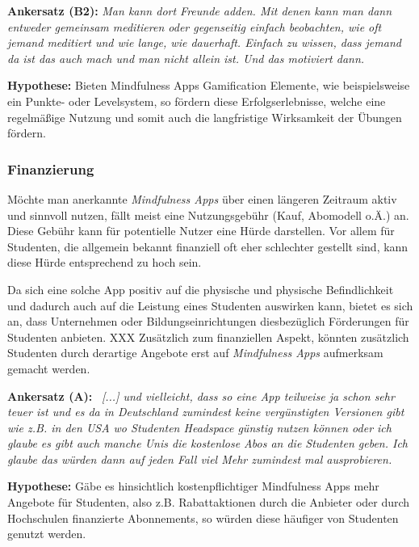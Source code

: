 \documentclass[10pt]{article}
\begin{document}
\medskip
\textbf{Ankersatz (B2):}
\newline
\grqq\textit{Man kann dort Freunde adden. Mit denen kann man dann entweder gemeinsam meditieren oder gegenseitig einfach beobachten, wie oft jemand meditiert und wie lange, wie dauerhaft. Einfach zu wissen, dass jemand da ist das auch mach und man nicht allein ist. Und das motiviert dann.}\grqq\
\medskip

\medskip
\textbf{Hypothese: }
\newline
Bieten Mindfulness Apps Gamification Elemente, wie beispielsweise ein Punkte- oder Levelsystem, so fördern diese Erfolgserlebnisse, welche eine regelmäßige Nutzung und somit auch die langfristige Wirksamkeit der Übungen fördern.

\subsubsection{Finanzierung}
Möchte man anerkannte \textit{Mindfulness Apps} über einen längeren Zeitraum aktiv und sinnvoll nutzen, fällt meist eine Nutzungsgebühr (Kauf, Abomodell o.Ä.) an. Diese Gebühr kann für potentielle Nutzer eine Hürde darstellen. Vor allem für Studenten, die allgemein bekannt finanziell oft eher schlechter gestellt sind,  kann diese Hürde entsprechend zu hoch sein.

Da sich eine solche App positiv auf die physische und physische  Befindlichkeit und dadurch auch auf die Leistung eines Studenten auswirken kann, bietet es sich an, dass Unternehmen oder  Bildungseinrichtungen diesbezüglich Förderungen für Studenten anbieten. XXX
Zusätzlich zum finanziellen Aspekt, könnten zusätzlich Studenten durch derartige Angebote erst auf \textit{Mindfulness Apps} aufmerksam gemacht werden.

\medskip
\textbf{Ankersatz (A):}
\newline
\grqq\ \textit{[...] und vielleicht, dass so eine App teilweise ja schon sehr teuer ist und es da in Deutschland zumindest keine vergünstigten Versionen gibt wie z.B. in den USA wo Studenten Headspace günstig nutzen können oder ich glaube es gibt auch manche Unis die kostenlose Abos an die Studenten geben. Ich glaube das würden dann auf jeden Fall viel Mehr zumindest mal ausprobieren. }\grqq\
\medskip

\medskip
\textbf{Hypothese: }
\newline
Gäbe es hinsichtlich kostenpflichtiger Mindfulness Apps mehr Angebote für Studenten, also z.B. Rabattaktionen durch die Anbieter oder durch Hochschulen finanzierte Abonnements, so würden diese häufiger von Studenten genutzt werden.
\end{document}
